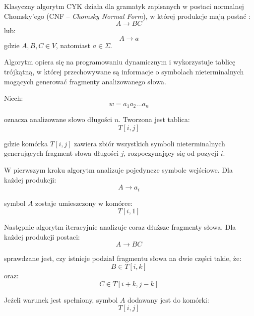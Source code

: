\documentclass[12pt]{article}
\begin{document}
Klasyczny algorytm CYK działa dla gramatyk zapisanych w postaci normalnej Chomsky’ego (CNF -- \textit{Chomsky Normal Form}), w której produkcje mają postać \cite{younger1967,kasami1965}:
\begin{equation}
A \rightarrow BC
\end{equation}
lub:
\begin{equation}
A \rightarrow a
\end{equation}
gdzie $A, B, C \in V$, natomiast $a \in \Sigma$.

Algorytm opiera się na programowaniu dynamicznym i wykorzystuje tablicę trójkątną, w której przechowywane są informacje o symbolach nieterminalnych mogących generować fragmenty analizowanego słowa.

Niech:
\begin{equation}
w = a_1 a_2 \dots a_n
\end{equation}

oznacza analizowane słowo długości $n$. Tworzona jest tablica:
\begin{equation}
T[i,j]
\end{equation}

gdzie komórka $T[i,j]$ zawiera zbiór wszystkich symboli nieterminalnych generujących fragment słowa długości $j$, rozpoczynający się od pozycji $i$.

W pierwszym kroku algorytm analizuje pojedyncze symbole wejściowe. Dla każdej produkcji:
\begin{equation}
A \rightarrow a_i
\end{equation}

symbol $A$ zostaje umieszczony w komórce:
\begin{equation}
T[i,1]
\end{equation}

Następnie algorytm iteracyjnie analizuje coraz dłuższe fragmenty słowa. Dla każdej produkcji postaci:
\begin{equation}
A \rightarrow BC
\end{equation}

sprawdzane jest, czy istnieje podział fragmentu słowa na dwie części takie, że:
\begin{equation}
B \in T[i,k]
\end{equation}
oraz:
\begin{equation}
C \in T[i+k,j-k]
\end{equation}

Jeżeli warunek jest spełniony, symbol $A$ dodawany jest do komórki:
\begin{equation}
T[i,j]
\end{equation}
\end{document}
